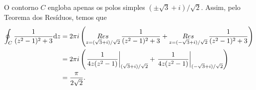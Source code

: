 \begin{questions}
%
\begin{solution}
    O contorno $C$ engloba apenas os polos simples $(\pm\sqrt{3}+i)/\sqrt{2}$. Assim, pelo Teorema dos Resíduos, temos que
    \begin{align*}
        \oint_C \frac{1}{(z^2-1)^2 + 3} \mathrm{d} z 
            &= 2\pi i \left( \mathop{Res}\limits_{z=(\sqrt{3}+i)/\sqrt{2}} \frac{1}{(z^2-1)^2 + 3} + \mathop{Res}\limits_{z=(-\sqrt{3}+i)/\sqrt{2}} \frac{1}{(z^2-1)^2 + 3} \right)\\
            &= 2\pi i \left( \left. \frac{1}{4z(z^2-1)} \right|_{(\sqrt{3}+i)/\sqrt{2}} + \left. \frac{1}{4z(z^2-1)} \right|_{(-\sqrt{3}+i)/\sqrt{2}} \right) \\
            &= \frac{\pi}{2\sqrt{2}}.
    \end{align*}
\end{solution}


\end{questions}
